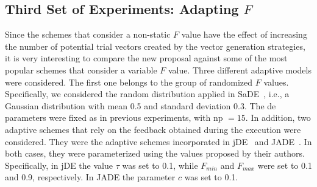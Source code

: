 \documentclass[preprint,3p]{elsarticle}
\newcommand{\CDE}{c{\sc de}}
\newcommand{\DE}{{\sc de}}
\newcommand{\NP}{{\sc np}}
\begin{document}



\subsection{Third Set of Experiments: Adapting $F$}

Since the schemes that consider a non-static $F$ value have the effect of increasing the number of potential trial vectors created
by the vector generation strategies, it is very interesting to compare the new proposal against some of the most popular schemes
that consider a variable $F$ value.
%
Three different adaptive models were considered.
%
The first one belongs to the group of randomized $F$ values.
%
Specifically, we considered the random distribution applied in SaDE~\cite{Qin:09}, i.e., a Gaussian distribution
with mean 0.5 and standard deviation 0.3.
%
The \DE{} parameters were fixed as in previous experiments, with \NP{} $= 15$.
%
In addition, two adaptive schemes that rely on the feedback obtained during the execution were considered.
%
They were the adaptive schemes incorporated in jDE~\cite{Brest:06} and JADE~\cite{Zhang:09}.
%
In both cases, they were parameterized using the values proposed by their authors.
%
Specifically, in jDE the value $\tau$ was set to 0.1, while $F_{min}$ and $F_{max}$ were set to 0.1 and 0.9, respectively.
%
In JADE the parameter $c$ was set to 0.1.
%


%




\end{document}
